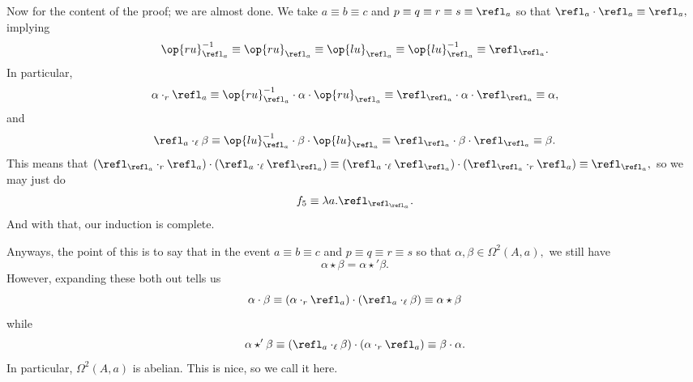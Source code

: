 Now for the content of the proof; we are almost done. We take $a\equiv b\equiv c$ and $p\equiv q\equiv r\equiv s\equiv\refl_a$ so that $\refl_a\cdot\refl_a\equiv\refl_a,$ implying
\[\op{ru}^{-1}_{\refl_a}\equiv\op{ru}_{\refl_a}\equiv\op{lu}_{\refl_a}\equiv\op{lu}^{-1}_{\refl_a}\equiv\refl_{\refl_a}.\]
In particular,
\[\alpha\cdot_r\refl_a\equiv\op{ru}_{\refl_a}^{-1}\cdot\alpha\cdot\op{ru}_{\refl_a}\equiv\refl_{\refl_a}\cdot\alpha\cdot\refl_{\refl_a}\equiv\alpha,\]
and
\[\refl_a\cdot_\ell\beta\equiv\op{lu}_{\refl_a}^{-1}\cdot\beta\cdot\op{lu}_{\refl_a}\equiv\refl_{\refl_a}\cdot\beta\cdot\refl_{\refl_a}\equiv\beta.\]
This means that $(\refl_{\refl_a}\cdot_r\refl_a)\cdot(\refl_a\cdot_\ell\refl_{\refl_a})\equiv(\refl_a\cdot_\ell\refl_{\refl_a})\cdot(\refl_{\refl_a}\cdot_r\refl_a)\equiv\refl_{\refl_a},$ so we may just do
\[f_5\equiv\lambda a.\refl_{\refl_{\refl_a}}.\]
And with that, our induction is complete.

Anyways, the point of this is to say that in the event $a\equiv b\equiv c$ and $p\equiv q\equiv r\equiv s$ so that $\alpha,\beta\in\Omega^2(A,a),$ we still have
\[\alpha\star\beta=\alpha\star'\beta.\]
However, expanding these both out tells us
\[\alpha\cdot\beta\equiv(\alpha\cdot_r\refl_a)\cdot(\refl_a\cdot_\ell\beta)\equiv\alpha\star\beta\]
while
\[\alpha\star'\beta\equiv(\refl_a\cdot_\ell\beta)\cdot(\alpha\cdot_r\refl_a)\equiv\beta\cdot\alpha.\]
In particular, $\Omega^2(A,a)$ is abelian. This is nice, so we call it here.


